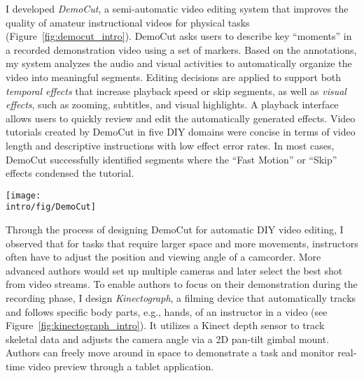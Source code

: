 I developed \emph{DemoCut}, a semi-automatic video editing system that improves the quality of amateur instructional videos for physical tasks (Figure~\ref{fig:democut_intro}). DemoCut asks users to describe key ``moments'' in a recorded demonstration video using a set of markers. Based on the annotations, my system analyzes the audio and visual activities to automatically organize the video into meaningful segments. Editing decisions are applied to support both \emph{temporal effects} that increase playback speed or skip segments, as well as \emph{visual effects}, such as zooming, subtitles, and visual highlights. A playback interface allows users to quickly review and edit the automatically generated effects.
%
Video tutorials created by DemoCut in five DIY domains were concise in terms of video length and descriptive instructions with low effect error rates. In most cases, DemoCut successfully identified segments where the ``Fast Motion'' or ``Skip'' effects condensed the tutorial.


\begin{figure*}[t]
  \centering
  \texttt{[image: \\intro/fig/DemoCut]}
  \caption{DemoCut asks users to mark key moments in a recorded video of demonstration using a set of marker types (Left). Based on these markers, the system uses audio and video analysis to automatically organize the video into meaningful segments and apply appropriate video editing effects. A playback UI provides lightweight editing for authors to review and modify automatic results (Right).}
  \label{fig:democut_intro}
\end{figure*}

Through the process of designing DemoCut for automatic DIY video editing, I observed that for tasks that require larger space and more movements, instructors often have to adjust the position and viewing angle of a camcorder. More advanced authors would set up multiple cameras and later select the best shot from video streams.
%
To enable authors to focus on their demonstration during the recording phase, I design \emph{Kinectograph}, a filming device that automatically tracks and follows specific body parts, e.g., hands, of an instructor in a video (see Figure~\ref{fig:kinectograph_intro}). It utilizes a Kinect depth sensor to track skeletal data and adjusts the camera angle via a 2D pan-tilt gimbal mount. Authors can freely move around in space to demonstrate a task and monitor real-time video preview through a tablet application.

